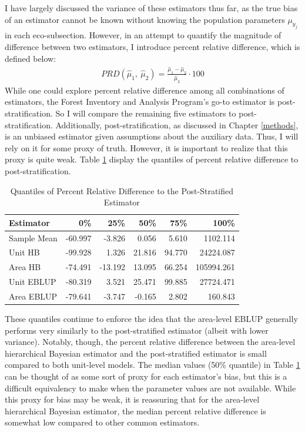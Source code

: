 \documentclass[12pt,twoside]{reedthesis}
\begin{document}
I have largely discussed the variance of these estimators thus far, as the true bias of an estimator cannot be known without knowing the population parameters \(\mu_{y_j}\) in each eco-subsection. However, in an attempt to quantify the magnitude of difference between two estimators, I introduce percent relative difference, which is defined below:
\begin{align*}
PRD(\hat\mu_1,~ \hat\mu_2) = \frac{\hat \mu_1 - \hat\mu_2}{\hat\mu_2} \cdot 100
\end{align*}
While one could explore percent relative difference among all combinations of estimators, the Forest Inventory and Analysis Program's go-to estimator is post-stratification. So I will compare the remaining five estimators to post-stratification. Additionally, post-stratification, as discussed in Chapter \ref{methods}, is an unbiased estimator given assumptions about the auxiliary data. Thus, I will rely on it for some proxy of truth. However, it is important to realize that this proxy is quite weak. Table \ref{tab:prd-tab} display the quantiles of percent relative difference to post-stratification.
\begin{longtable}[t]{lrrrrr}
\caption{\label{tab:prd-tab}Quantiles of Percent Relative Difference to the Post-Stratified Estimator}\\
\toprule
Estimator & 0\% & 25\% & 50\% & 75\% & 100\%\\
\midrule
Sample Mean & -60.997 & -3.826 & 0.056 & 5.610 & 1102.114\\
Unit HB & -99.928 & 1.326 & 21.816 & 94.770 & 24224.087\\
Area HB & -74.491 & -13.192 & 13.095 & 66.254 & 105994.261\\
Unit EBLUP & -80.319 & 3.521 & 25.471 & 99.885 & 27724.471\\
Area EBLUP & -79.641 & -3.747 & -0.165 & 2.802 & 160.843\\
\bottomrule
\end{longtable}
These quantiles continue to enforce the idea that the area-level EBLUP generally performs very similarly to the post-stratified estimator (albeit with lower variance). Notably, though, the percent relative difference between the area-level hierarchical Bayesian estimator and the post-stratified estimator is small compared to both unit-level models. The median values (50\% quantile) in Table \ref{tab:prd-tab} can be thought of as some sort of proxy for each estimator's bias, but this is a difficult equivalency to make when the parameter values are not available. While this proxy for bias may be weak, it is reassuring that for the area-level hierarchical Bayesian estimator, the median percent relative difference is somewhat low compared to other common estimators.
\end{document}
